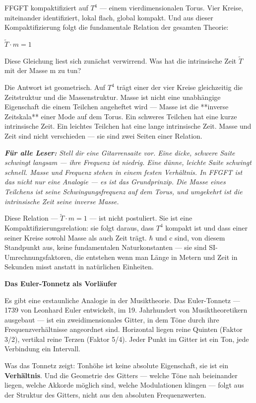\documentclass[11pt,oneside]{book}
\newenvironment{laierspur}{%
  \par\vspace{4pt}%
  \noindent\small\itshape\color{blue!60!black}%
  \textbf{Für alle Leser:}\enspace\ignorespaces}{%
  \par\vspace{4pt}\normalsize\normalfont\normalcolor}
\begin{document}
FFGFT kompaktifiziert auf $T^4$ — einem vierdimensionalen Torus. Vier Kreise,
miteinander identifiziert, lokal flach, global kompakt. Und aus dieser
Kompaktifizierung folgt die fundamentale Relation der gesamten Theorie:


\textbf{$\tilde{T}\cdot m = 1$}


Diese Gleichung liest sich zunächst verwirrend. Was hat die intrinsische
Zeit $\tilde{T}$ mit der Masse m zu tun?


Die Antwort ist geometrisch. Auf $T^4$ trägt einer der vier Kreise gleichzeitig
die Zeitstruktur und die Massenstruktur. Masse ist nicht eine unabhängige
Eigenschaft die einem Teilchen angeheftet wird — Masse ist die **inverse
Zeitskala** einer Mode auf dem Torus. Ein schweres Teilchen hat eine kurze
intrinsische Zeit. Ein leichtes Teilchen hat eine lange intrinsische Zeit.
Masse und Zeit sind nicht verschieden — sie sind zwei Seiten einer Relation.


\begin{laierspur}
Stell dir eine Gitarrensaite vor. Eine dicke, schwere Saite
schwingt langsam — ihre Frequenz ist niedrig. Eine dünne, leichte Saite
schwingt schnell. Masse und Frequenz stehen in einem festen Verhältnis.
In FFGFT ist das nicht nur eine Analogie — es ist das Grundprinzip. Die
Masse eines Teilchens ist seine Schwingungsfrequenz auf dem Torus, und
umgekehrt ist die intrinsische Zeit seine inverse Masse.
\end{laierspur}

Diese Relation — $\tilde{T}\cdot m = 1$ — ist nicht postuliert. Sie ist eine
Kompaktifizierungsrelation: sie folgt daraus, dass $T^4$ kompakt ist und
dass einer seiner Kreise sowohl Masse als auch Zeit trägt. $\hbar$ und c sind,
von diesem Standpunkt aus, keine fundamentalen Naturkonstanten — sie sind
SI-Umrechnungsfaktoren, die entstehen wenn man Länge in Metern und Zeit
in Sekunden misst anstatt in natürlichen Einheiten.


\textbf{Das Euler-Tonnetz als Vorläufer}


Es gibt eine erstaunliche Analogie in der Musiktheorie. Das Euler-Tonnetz —
1739 von Leonhard Euler entwickelt, im 19. Jahrhundert von Musiktheoretikern
ausgebaut — ist ein zweidimensionales Gitter, in dem Töne durch ihre
Frequenzverhältnisse angeordnet sind. Horizontal liegen reine Quinten
(Faktor 3/2), vertikal reine Terzen (Faktor 5/4). Jeder Punkt im Gitter
ist ein Ton, jede Verbindung ein Intervall.


Was das Tonnetz zeigt: Tonhöhe ist keine absolute Eigenschaft, sie ist ein
\textbf{Verhältnis}. Und die Geometrie des Gitters — welche Töne nah beieinander
liegen, welche Akkorde möglich sind, welche Modulationen klingen — folgt aus
der Struktur des Gitters, nicht aus den absoluten Frequenzwerten.
\end{document}
